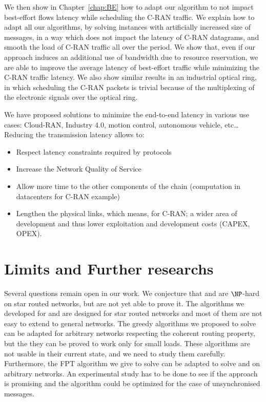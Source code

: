 We then show in Chapter~\ref{chap:BE} how to adapt our algorithm to not impact best-effort flows latency while scheduling the C-RAN traffic. We explain how to adapt all our algorithms, by solving instances with artificially increased size of messages, in a way which does not impact the latency of C-RAN datagrams, and smooth the load of C-RAN traffic all over the period. 
 We show that, even if our approach induces an additional use of bandwidth due to resource reservation, we are able to improve the average latency of best-effort traffic while minimizing the C-RAN traffic latency. We also show similar results in an industrial optical ring, in which scheduling the C-RAN packets is trivial because of the multiplexing of the electronic signals over the optical ring.

We have proposed solutions to minimize the end-to-end latency in various use cases: Cloud-RAN, Industry 4.0, motion control, autonomous vehicle, etc\ldots
Reducing the transmission latency allows to:
\begin{itemize}
	\item Respect latency constraints required by protocols
	\item Increase the Network Quality of Service 
	\item Allow more time to the other components of the chain (computation in datacenters for C-RAN example) 
	\item Lengthen the physical links, which means, for C-RAN; a wider area of development and thus lower exploitation and development costs (CAPEX, OPEX).
\end{itemize} 

\section*{Limits and Further researchs}

Several questions remain open in our work. We conjecture that \pazl and \pall are $\NP$-hard on star routed networks, but are not yet able to prove it. 
The algorithms we developed for \pazl and \pall are designed for star routed networks and most of them are not easy to extend to general networks. The greedy algorithms we proposed to solve \pazl can be adapted for arbitrary networks respecting the coherent routing property, but the they can be proved to work only for small loads. These algorithms are not usable in their current state, and we need to study them carefully. Furthermore, the FPT algorithm we give to solve \minstra can be adapted to solve \pazl and \pall on arbitrary networks.
An experimental study has to be done to see if the approach is promising and the algorithm could be optimized for the case of unsynchronised messages.


